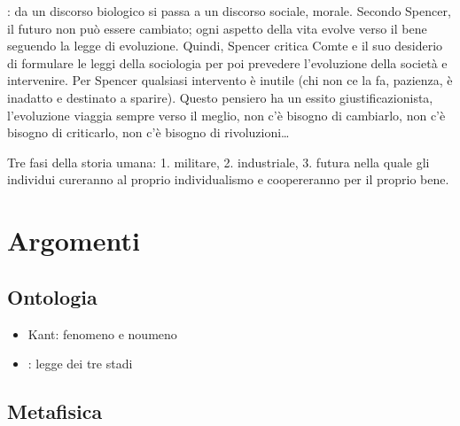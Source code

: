 \documentclass[letterpaper,10pt,italian]{jupyterBook}
\begin{document}
\sphinxAtStartPar
{}: da un discorso biologico si passa a un discorso sociale, morale. Secondo Spencer, il futuro non può essere cambiato; ogni aspetto della vita evolve verso il bene seguendo la legge di evoluzione. Quindi, Spencer critica Comte e il suo desiderio di formulare le leggi della sociologia per poi prevedere l’evoluzione della società e intervenire. Per Spencer qualsiasi intervento è inutile (chi non ce la fa, pazienza, è inadatto e destinato a sparire). Questo pensiero ha un essito giustificazionista, l’evoluzione viaggia sempre verso il meglio, non c’è bisogno di cambiarlo, non c’è bisogno di criticarlo, non c’è bisogno di rivoluzioni…

\sphinxAtStartPar
Tre fasi della storia umana: 1. militare, 2. industriale, 3. futura nella quale gli individui cureranno al proprio individualismo e coopereranno per il proprio bene.

\sphinxAtStartPar
{}

\sphinxstepscope


\chapter{Argomenti}
\label{\detokenize{ch/topics:argomenti}}\label{\detokenize{ch/topics:philosophy-topics}}\label{\detokenize{ch/topics::doc}}

\section{Ontologia}
\label{\detokenize{ch/topics:ontologia}}\begin{itemize}
\item {} 
\sphinxAtStartPar
Kant: fenomeno e noumeno

\item {} 
\sphinxAtStartPar
{\hyperref[\detokenize{ch/history:pc-comte}]{}}: legge dei tre stadi

\end{itemize}


\section{Metafisica}
\label{\detokenize{ch/topics:metafisica}}
\end{document}
